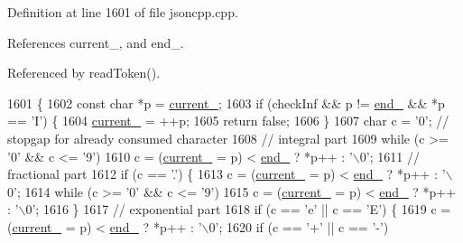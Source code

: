 Definition at line 1601 of file jsoncpp.\+cpp.



References current\+\_\+, and end\+\_\+.



Referenced by read\+Token().


\begin{DoxyCode}
1601                                         \{
1602   \textcolor{keyword}{const} \textcolor{keywordtype}{char} *p = \hyperlink{class_json_1_1_our_reader_a5211fbbba94be80a22dd2317c621efcc}{current\_};
1603   \textcolor{keywordflow}{if} (checkInf && p != \hyperlink{class_json_1_1_our_reader_ab1f69b0260c27a0d2d65dc56e42c8f9d}{end\_} && *p == \textcolor{charliteral}{'I'}) \{
1604     \hyperlink{class_json_1_1_our_reader_a5211fbbba94be80a22dd2317c621efcc}{current\_} = ++p;
1605     \textcolor{keywordflow}{return} \textcolor{keyword}{false};
1606   \}
1607   \textcolor{keywordtype}{char} c = \textcolor{charliteral}{'0'}; \textcolor{comment}{// stopgap for already consumed character}
1608   \textcolor{comment}{// integral part}
1609   \textcolor{keywordflow}{while} (c >= \textcolor{charliteral}{'0'} && c <= \textcolor{charliteral}{'9'})
1610     c = (\hyperlink{class_json_1_1_our_reader_a5211fbbba94be80a22dd2317c621efcc}{current\_} = p) < \hyperlink{class_json_1_1_our_reader_ab1f69b0260c27a0d2d65dc56e42c8f9d}{end\_} ? *p++ : \textcolor{charliteral}{'\(\backslash\)0'};
1611   \textcolor{comment}{// fractional part}
1612   \textcolor{keywordflow}{if} (c == \textcolor{charliteral}{'.'}) \{
1613     c = (\hyperlink{class_json_1_1_our_reader_a5211fbbba94be80a22dd2317c621efcc}{current\_} = p) < \hyperlink{class_json_1_1_our_reader_ab1f69b0260c27a0d2d65dc56e42c8f9d}{end\_} ? *p++ : \textcolor{charliteral}{'\(\backslash\)0'};
1614     \textcolor{keywordflow}{while} (c >= \textcolor{charliteral}{'0'} && c <= \textcolor{charliteral}{'9'})
1615       c = (\hyperlink{class_json_1_1_our_reader_a5211fbbba94be80a22dd2317c621efcc}{current\_} = p) < \hyperlink{class_json_1_1_our_reader_ab1f69b0260c27a0d2d65dc56e42c8f9d}{end\_} ? *p++ : \textcolor{charliteral}{'\(\backslash\)0'};
1616   \}
1617   \textcolor{comment}{// exponential part}
1618   \textcolor{keywordflow}{if} (c == \textcolor{charliteral}{'e'} || c == \textcolor{charliteral}{'E'}) \{
1619     c = (\hyperlink{class_json_1_1_our_reader_a5211fbbba94be80a22dd2317c621efcc}{current\_} = p) < \hyperlink{class_json_1_1_our_reader_ab1f69b0260c27a0d2d65dc56e42c8f9d}{end\_} ? *p++ : \textcolor{charliteral}{'\(\backslash\)0'};
1620     \textcolor{keywordflow}{if} (c == \textcolor{charliteral}{'+'} || c == \textcolor{charliteral}{'-'})

\end{DoxyCode}
